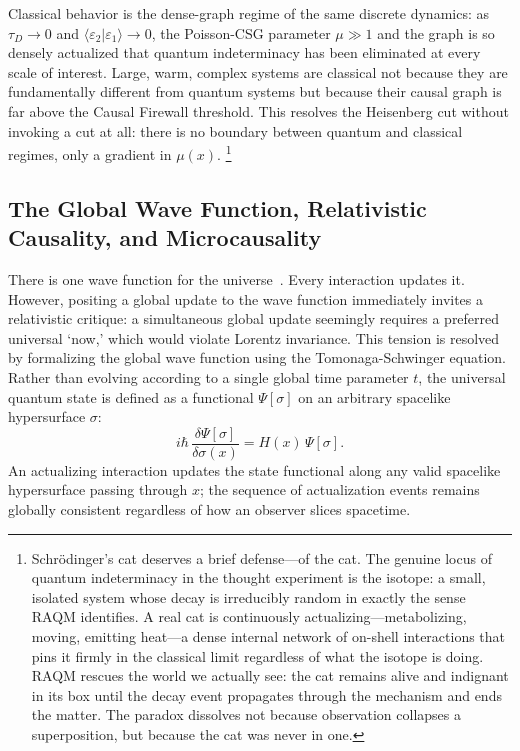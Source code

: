 \documentclass[11pt,a4paper]{article}
\theoremstyle{plain}
\theoremstyle{definition}
\theoremstyle{remark}
\newcommand{\braket}[2]{\langle #1 | #2 \rangle}
\begin{document}
Classical behavior is the dense-graph regime of the same discrete dynamics:
as $\tau_D \to 0$ and $\braket{\varepsilon_2}{\varepsilon_1} \to 0$,
the Poisson-CSG parameter $\mu \gg 1$ and the graph is so densely
actualized that quantum indeterminacy has been eliminated at every scale
of interest. Large, warm, complex systems are classical not because they
are fundamentally different from quantum systems but because their causal
graph is far above the Causal Firewall threshold. This resolves the
Heisenberg cut without invoking a cut at all: there is no boundary between
quantum and classical regimes, only a gradient in $\mu(x)$.%
\footnote{Schr\"{o}dinger's cat deserves a brief defense---of the cat. The genuine
locus of quantum indeterminacy in the thought experiment is the isotope: a small,
isolated system whose decay is irreducibly random in exactly the sense RAQM
identifies. A real cat is continuously actualizing---metabolizing, moving, emitting
heat---a dense internal network of on-shell interactions that pins it firmly in the
classical limit regardless of what the isotope is doing. RAQM rescues the world we
actually see: the cat remains alive and indignant in its box until the decay event
propagates through the mechanism and ends the matter. The paradox dissolves not
because observation collapses a superposition, but because the cat was never in
one.}

\subsection{The Global Wave Function, Relativistic Causality, and Microcausality}
\label{sec:relativity}

There is one wave function for the
universe~\citep{HartleHawking1983}. Every interaction updates it. However,
positing a global update to the wave function immediately invites a relativistic
critique: a simultaneous global update seemingly requires a preferred universal
`now,' which would violate Lorentz invariance. This tension is resolved by
formalizing the global wave function using the Tomonaga-Schwinger equation. Rather
than evolving according to a single global time parameter $t$, the universal
quantum state is defined as a functional $\Psi[\sigma]$ on an arbitrary spacelike
hypersurface $\sigma$:
\begin{equation}
  i\hbar\,\frac{\delta\Psi[\sigma]}{\delta\sigma(x)} = H(x)\,\Psi[\sigma].
\end{equation}
An actualizing interaction updates the state functional along any valid spacelike
hypersurface passing through $x$; the sequence of actualization events remains
globally consistent regardless of how an observer slices spacetime.
\end{document}
